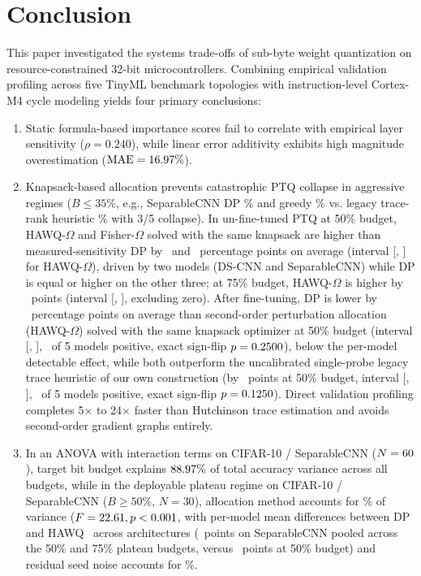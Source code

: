 \documentclass{ieeeaccess}
\begin{document}
\section{Conclusion}
\label{sec:conclusion}
This paper investigated the systems trade-offs of sub-byte weight quantization on resource-constrained 32-bit microcontrollers. Combining empirical validation profiling across five TinyML benchmark topologies with instruction-level Cortex-M4 cycle modeling yields four primary conclusions:
\begin{enumerate}
    \item Static formula-based importance scores fail to correlate with empirical layer sensitivity ($\rho = 0.240$), while linear error additivity exhibits high magnitude overestimation ($\text{MAE} = 16.97\%$).
    \item Knapsack-based allocation prevents catastrophic PTQ collapse in aggressive regimes ($B \le 35\%$, e.g., SeparableCNN DP \MacroSepCNNDPThirtyFivePTQ\% and greedy \MacroSepCNNGreedyThirtyFivePTQ\% vs. legacy trace-rank heuristic \MacroSepCNNHAWQThirtyFivePTQ\% with 3/5 collapse). In un-fine-tuned PTQ at 50\% budget, HAWQ-$\Omega$ and Fisher-$\Omega$ solved with the same knapsack are higher than measured-sensitivity DP by \MacroPTQDPOmegaAbsMeanFifty\ and \MacroPTQDPFisherAbsMeanFifty\ percentage points on average (interval [\MacroPTQDPOmegaCILowFifty, \MacroPTQDPOmegaCIHighFifty] for HAWQ-$\Omega$), driven by two models (DS-CNN and SeparableCNN) while DP is equal or higher on the other three; at 75\% budget, HAWQ-$\Omega$ is higher by \MacroPTQDPOmegaAbsMeanSeventyFive\ points (interval [\MacroPTQDPOmegaCILowSeventyFive, \MacroPTQDPOmegaCIHighSeventyFive], excluding zero). After fine-tuning, DP is lower by \MacroOmegaAbsMeanDelta\ percentage points on average than second-order perturbation allocation (HAWQ-$\Omega$) solved with the same knapsack optimizer at 50\% budget (interval [\MacroOmegaCILow, \MacroOmegaCIHigh], \MacroOmegaWins\ of 5 models positive, exact sign-flip $p = 0.2500$), below the per-model detectable effect, while both outperform the uncalibrated single-probe legacy trace heuristic of our own construction (by \MacroLegacyMeanDelta\ points at 50\% budget, interval [\MacroLegacyCILow, \MacroLegacyCIHigh], \MacroLegacyWins\ of 5 models positive, exact sign-flip $p = 0.1250$). Direct validation profiling completes 5$\times$ to 24$\times$ faster than Hutchinson trace estimation and avoids second-order gradient graphs entirely.
    \item In an ANOVA with interaction terms on CIFAR-10 / SeparableCNN ($N = 60$), target bit budget explains $88.97\%$ of total accuracy variance across all budgets, while in the deployable plateau regime on CIFAR-10 / SeparableCNN ($B \ge 50\%$, $N = 30$), allocation method accounts for \MacroVarPlateauMethodPct\% of variance ($F = 22.61, p < 0.001$, with per-model mean differences between DP and HAWQ \MacroDPHAWQFiftyRange\ across architectures (\MacroMethodPlateauSepEffect\ points on SeparableCNN pooled across the 50\% and 75\% plateau budgets, versus \MacroSepCNNGainFifty\ points at 50\% budget) and residual seed noise accounts for \MacroVarPlateauResidualPct\%.

\end{enumerate}
\end{document}

